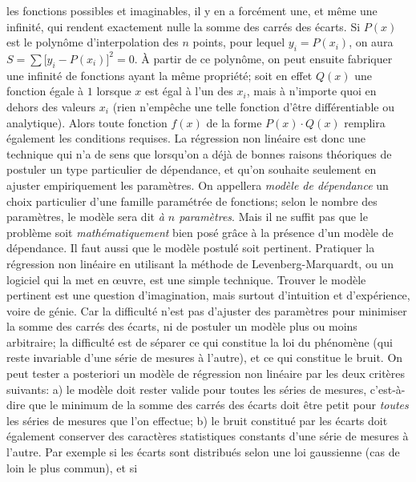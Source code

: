 les fonctions possibles et imaginables, il y en a forc\'ement une, et 
m\^eme une infinit\'e, qui rendent exactement nulle la somme des 
carr\'es des \'ecarts. Si $P(x)$ est le polyn\^ome
d'interpolation des $n$ points, pour lequel $y_i = P(x_i)$, on aura 
$S = \sum \big[ y_i - P(x_i)\big]^2 = 0$. \`A partir de ce polyn\^ome, 
on peut ensuite fabriquer une infinit\'e de fonctions ayant la m\^eme 
propri\'et\'e; soit en effet $Q(x)$ une fonction \'egale \`a $1$ lorsque 
$x$ est \'egal \`a l'un des $x_i$, mais \`a n'importe quoi en dehors 
des valeurs $x_i$ (rien n'emp\^eche une telle fonction d'\^etre 
diff\'erentiable ou analytique).  Alors toute fonction $f(x)$ de la forme 
$P(x) \cdot Q(x)$ remplira \'egalement les conditions requises. 
\medskip 
La r\'egression non lin\'eaire est donc une technique qui n'a de sens
que lorsqu'on a d\'ej\`a de bonnes raisons th\'eoriques de postuler un 
type particulier de d\'ependance, et qu'on souhaite seulement en
ajuster empiriquement les param\`etres. 
\medskip 
On appellera {\it mod\`ele de d\'ependance} un choix particulier d'une 
famille param\'etr\'ee de fonctions; selon le nombre des param\`etres, 
le mod\`ele sera dit {\it \`a $n$ param\`etres}. 
 \medskip 
Mais il ne suffit pas que le probl\`eme soit {\it math\'ematiquement} 
bien pos\'e gr\^ace \`a la pr\'esence d'un mod\`ele de d\'ependance. Il 
faut aussi que le mod\`ele postul\'e soit pertinent. Pratiquer la 
r\'egression non lin\'eaire en utilisant la m\'ethode de Levenberg-Marquardt, 
ou un logiciel qui la met en \oe uvre, est une 
simple technique. Trouver le mod\`ele pertinent est une question 
d'imagination, mais surtout d'intuition et d'exp\'erience, voire de 
g\'enie. Car la difficult\'e n'est pas d'ajuster des param\`etres pour 
minimiser la somme des carr\'es des \'ecarts, ni de postuler un 
mod\`ele plus ou moins arbitraire; la difficult\'e est de s\'eparer ce 
qui constitue la loi du ph\'enom\`ene (qui reste invariable d'une s\'erie 
de mesures \`a l'autre), et ce qui constitue le bruit. On peut tester a 
posteriori un mod\`ele de r\'egression non lin\'eaire par les deux 
crit\`eres suivants: 
\smallskip 
a) le mod\`ele doit rester valide pour toutes les s\'eries de mesures, 
c'est-\`a-dire que le minimum de la somme des carr\'es des \'ecarts
doit \^etre petit pour {\it toutes} les s\'eries de mesures que l'on 
effectue; 
\smallskip 
b) le bruit constitu\'e par les \'ecarts doit \'egalement conserver des 
caract\`eres statistiques constants d'une s\'erie de mesures \`a
l'autre. Par exemple si les \'ecarts sont distribu\'es selon une 
loi gaussienne (cas de loin le plus commun), et si 
